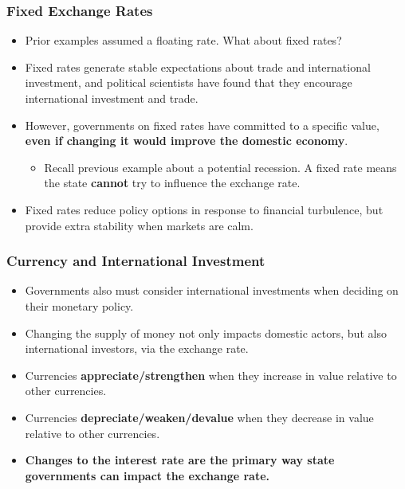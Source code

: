 \documentclass{beamer}
\begin{document}
\begin{frame} 
	\frametitle{\LARGE{Fixed Exchange Rates}}
	\begin{itemize}
		\item Prior examples assumed a floating rate. What about fixed rates? \pause
		\item Fixed rates generate stable expectations about trade and international investment, and political scientists have found that they encourage international investment and trade. \pause 
		\item However, governments on fixed rates have committed to a specific value, \textbf{even if changing it would improve the domestic economy}. \pause
		\begin{itemize}
			\item Recall previous example about a potential recession. A fixed rate means the state \textbf{cannot} try to influence the exchange rate. \pause
		\end{itemize}
		\item Fixed rates reduce policy options in response to financial turbulence, but provide extra stability when markets are calm.
	\end{itemize}
\end{frame}

\begin{frame} 
	\frametitle{\LARGE{Currency and International Investment}}
	\begin{itemize}
		\item Governments also must consider international investments when deciding on their monetary policy. \pause
		\item Changing the supply of money not only impacts domestic actors, but also international investors, via the exchange rate. \pause
		\item Currencies \textbf{appreciate/strengthen} when they increase in value relative to other currencies. \pause
		\item Currencies \textbf{depreciate/weaken/devalue} when they decrease in value relative to other currencies. \pause
		\item \textbf{Changes to the interest rate are the primary way state governments can impact the exchange rate.}		
	\end{itemize}
\end{frame}
\end{document}
